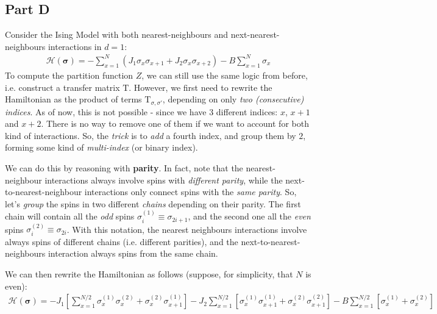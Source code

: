 \documentclass[12pt,a4paper]{report}
\begin{document}
\subsection{Part D}
Consider the Ising Model with both nearest-neighbours and next-nearest-neighbours interactions in $d=1$:
\begin{align*}
    \mathcal{H}(\bm{\sigma}) = - \sum_{x=1}^N (J_1 \sigma_x \sigma_{x+1} + J_2 \sigma_x \sigma_{x+2}) - B \sum_{x=1}^N \sigma_x
\end{align*}
To compute the partition function $Z$, we can still use the same logic from before, i.e. construct a transfer matrix $\mathrm{T}$. However, we first need to rewrite the Hamiltonian as the product of terms $\mathrm{T}_{\sigma, \sigma'}$, depending on only \textit{two (consecutive) indices}. As of now, this is not possible - since we have $3$ different indices: $x$, $x+1$ and $x+2$. There is no way to remove one of them if we want to account for both kind of interactions. So, the \textit{trick} is to \textit{add} a fourth index, and group them by $2$, forming some kind of \textit{multi-index} (or binary index).

\medskip

We can do this by reasoning with \textbf{parity}. In fact, note that the nearest-neighbour interactions always involve spins with \textit{different parity}, while the next-to-nearest-neighbour interactions only connect spins with the \textit{same parity}. So, let's \textit{group} the spins in two different \textit{chains} depending on their parity. The first chain will contain all the \textit{odd} spins $\sigma_i^{(1)} \equiv \sigma_{2i+1}$, and the second one all the \textit{even} spins $\sigma_{i}^{(2)} \equiv \sigma_{2i}$. With this notation, the nearest neighbours interactions involve always spins of different chains (i.e. different parities), and the next-to-nearest-neighbours interaction always spins from the same chain.

We can then rewrite the Hamiltonian as follows (suppose, for simplicity, that $N$ is even):
\begin{align}\label{eqn:h-parity}
    \mathcal{H}(\bm{\sigma}) = -J_1 [\sum_{x=1}^{N/2} \sigma_x^{(1)} \sigma_x^{(2)}+ \sigma_x^{(2)} \sigma_{x+1}^{(1)}] - J_2 \sum_{x=1}^{N/2} [ \sigma_x^{(1)} \sigma_{x+1}^{(1)} + \sigma_x^{(2)} \sigma_{x+1}^{(2)}] - B \sum_{x=1}^{N/2} [\sigma_x^{(1)}+ \sigma_{x}^{(2)}]
\end{align}
\end{document}
